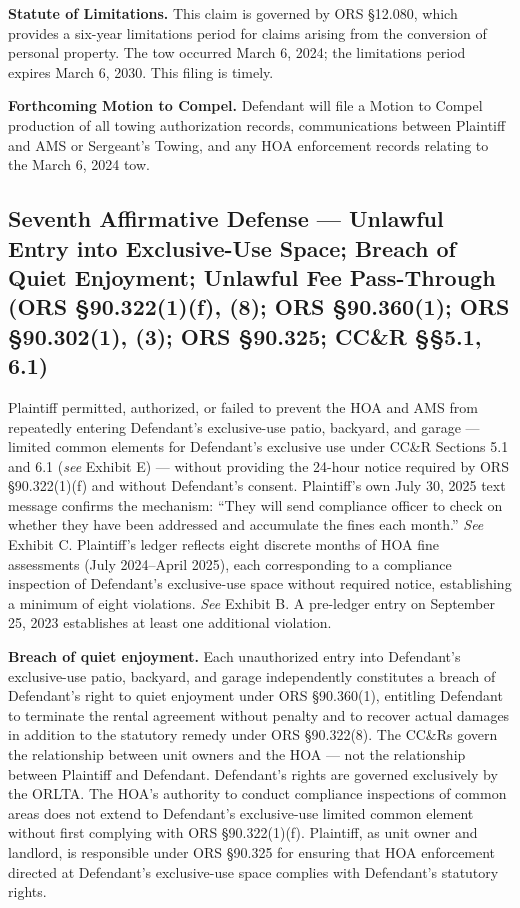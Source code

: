 \documentclass[12pt,letterpaper]{article}
\begin{document}
	\textbf{Statute of Limitations.} This claim is governed by ORS \S12.080, which provides a six-year limitations period for claims arising from the conversion of personal property. The tow occurred March 6, 2024; the limitations period expires March 6, 2030. This filing is timely.
	
	\textbf{Forthcoming Motion to Compel.} Defendant will file a Motion to Compel production of all towing authorization records, communications between Plaintiff and AMS or Sergeant's Towing, and any HOA enforcement records relating to the March 6, 2024 tow.
	
	\subsection{Seventh Affirmative Defense --- Unlawful Entry into Exclusive-Use Space; Breach of Quiet Enjoyment; Unlawful Fee Pass-Through (ORS \S90.322(1)(f), (8); ORS \S90.360(1); ORS \S90.302(1), (3); ORS \S90.325; CC\&R \S\S5.1, 6.1)}
	
	Plaintiff permitted, authorized, or failed to prevent the HOA and AMS from repeatedly entering Defendant's exclusive-use patio, backyard, and garage --- limited common elements for Defendant's exclusive use under CC\&R Sections 5.1 and 6.1 (\textit{see} Exhibit E) --- without providing the 24-hour notice required by ORS \S90.322(1)(f) and without Defendant's consent. Plaintiff's own July 30, 2025 text message confirms the mechanism: ``They will send compliance officer to check on whether they have been addressed and accumulate the fines each month.'' \textit{See} Exhibit C. Plaintiff's ledger reflects eight discrete months of HOA fine assessments (July 2024--April 2025), each corresponding to a compliance inspection of Defendant's exclusive-use space without required notice, establishing a minimum of eight violations. \textit{See} Exhibit B. A pre-ledger entry on September 25, 2023 establishes at least one additional violation.
	
	\textbf{Breach of quiet enjoyment.} Each unauthorized entry into Defendant's exclusive-use patio, backyard, and garage independently constitutes a breach of Defendant's right to quiet enjoyment under ORS \S90.360(1), entitling Defendant to terminate the rental agreement without penalty and to recover actual damages in addition to the statutory remedy under ORS \S90.322(8). The CC\&Rs govern the relationship between unit owners and the HOA --- not the relationship between Plaintiff and Defendant. Defendant's rights are governed exclusively by the ORLTA. The HOA's authority to conduct compliance inspections of common areas does not extend to Defendant's exclusive-use limited common element without first complying with ORS \S90.322(1)(f). Plaintiff, as unit owner and landlord, is responsible under ORS \S90.325 for ensuring that HOA enforcement directed at Defendant's exclusive-use space complies with Defendant's statutory rights.
	
\end{document}
